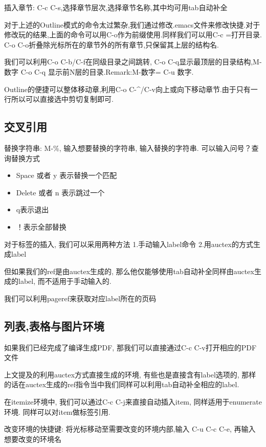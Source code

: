 \documentclass[UTF8]{ctexart}
\begin{document}
插入章节: C-c C-s,选择章节层次,选择章节名称,其中均可用tab自动补全

对于上述的Outline模式的命令太过繁杂,我们通过修改.emacs文件来修改快捷.对于修改玩的结果,上面的命令可以用C-o作为前缀使用.同样我们可以用C-c =打开目录. C-o C-o折叠除光标所在的章节外的所有章节,只保留其上层的结构名.

我们可以利用C-o C-b/C-f在同级目录之间跳转, C-o C-q显示最顶层的目录结构,M-数字 C-o C-q 显示前N层的目录.Remark:M-数字= C-u 数字.

Outline的便捷可以整体移动章,利用C-o C-\^\;/C-v向上或向下移动章节.由于只有一行所以可以直接选中剪切复制即可.
\subsection{交叉引用}
替换字符串: M-\%, 输入想要替换的字符串, 输入替换的字符串. 可以输入问号？查询替换方式

\begin{itemize}
\item Space 或者 y 表示替换一个匹配

\item Delete 或者 n 表示跳过一个

\item q表示退出

\item ！表示全部替换 
\end{itemize}

对于标签的插入, 我们可以采用两种方法 1.手动输入label命令 2.用auctex的方式生成label

但如果我们的ref是由auctex生成的, 那么他仅能够使用tab自动补全同样由auctex生成的label, 而不适用于手动输入的.

我们可以利用pageref来获取对应label所在的页码

\subsection{列表,表格与图片环境}
如果我们已经完成了编译生成PDF, 那我们可以直接通过C-c C-v打开相应的PDF文件

上文提及的利用auctex方式直接生成的环境, 有些也是直接含有label选项的, 那样的话在auctex生成的ref指令当中我们同样可以利用tab自动补全相应的label.

在itemize环境中, 我们可以通过C-c C-j来直接自动插入item, 同样适用于enumerate环境. 同样可以对item做标签引用.

改变环境的快捷键: 将光标移动至需要改变的环境内部,输入 C-u C-c C-e, 再输入想要改变的环境名
\end{document}
